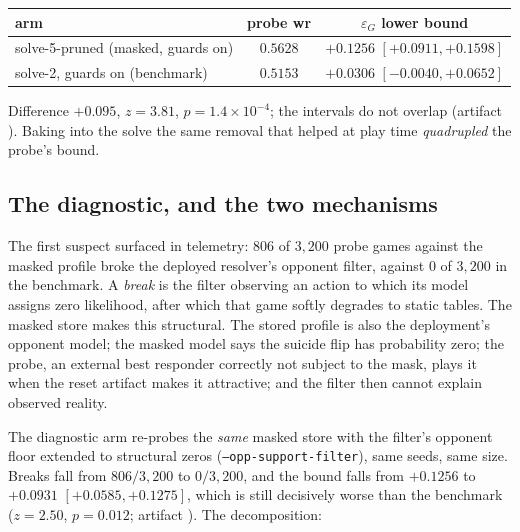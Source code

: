 \documentclass[11pt]{article}
\theoremstyle{plain}
\theoremstyle{definition}
\theoremstyle{remark}
\newcommand{\code}[1]{\texttt{\small #1}}
\newcommand{\game}{\ensuremath{G}}
\newcommand{\epsG}{\ensuremath{\varepsilon_{\game}}}
\begin{document}
\begin{center}\small
\begin{tabular}{@{}lcc@{}}
\toprule
arm & probe wr & $\epsG$ lower bound \\
\midrule
solve-5-pruned (masked, guards on) & $0.5628$ &
  $+0.1256$ $[+0.0911,+0.1598]$ \\
solve-2, guards on (benchmark) & $0.5153$ & $+0.0306$
  $[-0.0040,+0.0652]$ \\
\bottomrule
\end{tabular}
\end{center}

\noindent
Difference $+0.095$, $z=3.81$, $p=1.4\times10^{-4}$; the intervals do
not overlap (artifact ).
Baking into the solve the same removal that helped at play time
\emph{quadrupled} the probe's bound.

\subsection{The diagnostic, and the two mechanisms}

The first suspect surfaced in telemetry: $806$ of $3{,}200$ probe games
against the masked profile broke the deployed resolver's opponent
filter, against $0$ of $3{,}200$ in the benchmark. A \emph{break} is
the filter observing an action to which its model assigns zero
likelihood, after which that game softly degrades to static tables. The
masked store makes this structural. The stored profile is also the
deployment's opponent model; the masked model says the suicide flip has
probability zero; the probe, an external best responder correctly not
subject to the mask, plays it when the reset artifact makes it
attractive; and the filter then cannot explain observed reality.

The diagnostic arm re-probes the \emph{same} masked store with the
filter's opponent floor extended to structural zeros
(\code{--opp-support-filter}), same seeds, same size. Breaks fall from
$806/3{,}200$ to $0/3{,}200$, and the bound falls from $+0.1256$ to
$+0.0931$ $[+0.0585,+0.1275]$, which is still decisively worse than the
benchmark ($z=2.50$, $p=0.012$; artifact
). The decomposition:
\end{document}

